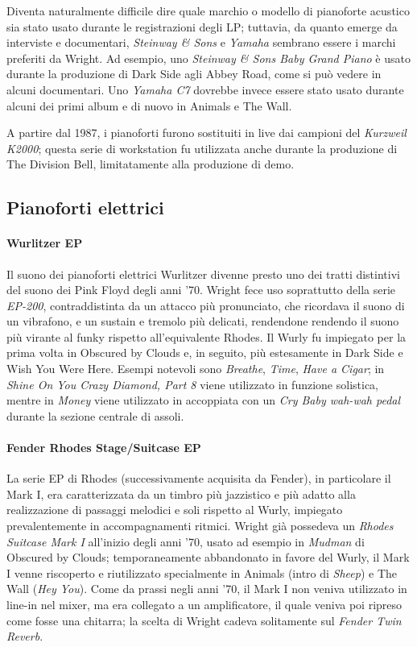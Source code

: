 \documentclass[class=book, crop=false, oneside, 12pt]{standalone}
\begin{document}
    Diventa naturalmente difficile dire quale marchio o modello di pianoforte acustico sia stato usato durante le registrazioni degli LP; tuttavia, da quanto emerge da interviste e documentari, \emph{Steinway \& Sons} e \emph{Yamaha} sembrano essere i marchi preferiti da Wright. Ad esempio, uno \emph{Steinway \& Sons Baby Grand Piano} è usato durante la produzione di Dark Side agli Abbey Road, come si può vedere in alcuni documentari. Uno \emph{Yamaha C7} dovrebbe invece essere stato usato durante alcuni dei primi album e di nuovo in Animals e The Wall.

    A partire dal 1987, i pianoforti furono sostituiti in live dai campioni del \emph{Kurzweil K2000}; questa serie di workstation fu utilizzata anche durante la produzione di The Division Bell, limitatamente alla produzione di demo.

    \subsection{Pianoforti elettrici}

    \paragraph{Wurlitzer EP}
    Il suono dei pianoforti elettrici Wurlitzer divenne presto uno dei tratti distintivi del suono dei Pink Floyd degli anni '70. Wright fece uso soprattutto della serie \emph{EP-200}, contraddistinta da un attacco più pronunciato, che ricordava il suono di un vibrafono, e un sustain e tremolo più delicati, rendendone rendendo il suono più virante al funky rispetto all'equivalente Rhodes. Il Wurly fu impiegato per la prima volta in Obscured by Clouds e, in seguito, più estesamente in Dark Side e Wish You Were Here. Esempi notevoli sono \emph{Breathe}, \emph{Time}, \emph{Have a Cigar}; in \emph{Shine On You Crazy Diamond, Part 8} viene utilizzato in funzione solistica, mentre in \emph{Money} viene utilizzato in accoppiata con un \emph{Cry Baby wah-wah pedal} durante la sezione centrale di assoli. 

    \paragraph{Fender Rhodes Stage/Suitcase EP}
    La serie EP di Rhodes (successivamente acquisita da Fender), in particolare il Mark I, era caratterizzata da un timbro più jazzistico e più adatto alla realizzazione di passaggi melodici e soli rispetto al Wurly, impiegato prevalentemente in accompagnamenti ritmici. Wright già possedeva un \emph{Rhodes Suitcase Mark I} all'inizio degli anni '70, usato ad esempio in \emph{Mudman} di Obscured by Clouds; temporaneamente abbandonato in favore del Wurly, il Mark I venne riscoperto e riutilizzato specialmente in Animals (intro di \emph{Sheep}) e The Wall (\emph{Hey You}). Come da prassi negli anni '70, il Mark I non veniva utilizzato in line-in nel mixer, ma era collegato a un amplificatore, il quale veniva poi ripreso come fosse una chitarra; la scelta di Wright cadeva solitamente sul \emph{Fender Twin Reverb}.
\end{document}
